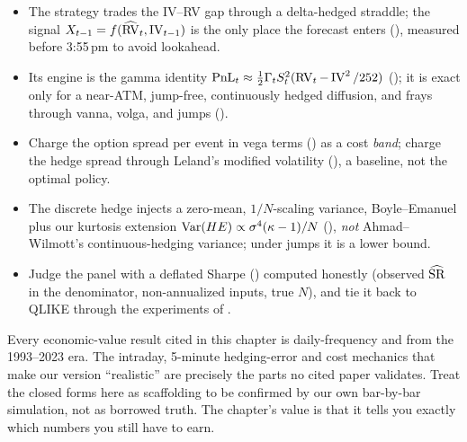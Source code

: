 \begin{keyresult}
\begin{itemize}
  \item The strategy trades the IV--RV gap through a delta-hedged straddle; the signal $X_{t-1} = f(\widehat{\operatorname{RV}}_t, \operatorname{IV}_{t-1})$ is the only place the forecast enters (), measured before 3:55\,pm to avoid lookahead.
  \item Its engine is the gamma identity $\text{PnL}_t \approx \tfrac12\Gamma_t S_t^2(\operatorname{RV}_t - \operatorname{IV}^2/252)$ (); it is exact only for a near-ATM, jump-free, continuously hedged diffusion, and frays through vanna, volga, and jumps ().
  \item Charge the option spread per event in vega terms () as a cost \emph{band}; charge the hedge spread through Leland's modified volatility (), a baseline, not the optimal policy.
  \item The discrete hedge injects a zero-mean, $1/N$-scaling variance, Boyle--Emanuel plus our kurtosis extension $\operatorname{Var}(HE) \propto \sigma^4(\kappa-1)/N$ (), \emph{not} Ahmad--Wilmott's continuous-hedging variance; under jumps it is a lower bound.
  \item Judge the panel with a deflated Sharpe () computed honestly (observed $\widehat{\operatorname{SR}}$ in the denominator, non-annualized inputs, true $N$), and tie it back to QLIKE through the experiments of .
\end{itemize}
\end{keyresult}

\begin{warning}
Every economic-value result cited in this chapter is daily-frequency and from the 1993--2023 era. The intraday, 5-minute hedging-error and cost mechanics that make our version ``realistic'' are precisely the parts no cited paper validates. Treat the closed forms here as scaffolding to be confirmed by our own bar-by-bar simulation, not as borrowed truth. The chapter's value is that it tells you exactly which numbers you still have to earn.
\end{warning}
